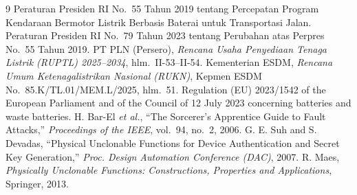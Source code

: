 \documentclass[11pt,a4paper]{article}
\begin{document}
\begin{thebibliography}{9}\small
{} Peraturan Presiden RI No.~55 Tahun 2019 tentang Percepatan Program Kendaraan Bermotor Listrik Berbasis Baterai untuk Transportasi Jalan.
 Peraturan Presiden RI No.~79 Tahun 2023 tentang Perubahan atas Perpres No.~55 Tahun 2019.
 PT PLN (Persero), \emph{Rencana Usaha Penyediaan Tenaga Listrik (RUPTL) 2025--2034}, hlm.~II-53--II-54.
 Kementerian ESDM, \emph{Rencana Umum Ketenagalistrikan Nasional (RUKN)}, Kepmen ESDM No.~85.K/TL.01/MEM.L/2025, hlm.~51.
 Regulation (EU) 2023/1542 of the European Parliament and of the Council of 12 July 2023 concerning batteries and waste batteries.
 H. Bar-El \emph{et al.}, ``The Sorcerer's Apprentice Guide to Fault Attacks,'' \emph{Proceedings of the IEEE}, vol.~94, no.~2, 2006.
 G. E. Suh and S. Devadas, ``Physical Unclonable Functions for Device Authentication and Secret Key Generation,'' \emph{Proc. Design Automation Conference (DAC)}, 2007.
 R. Maes, \emph{Physically Unclonable Functions: Constructions, Properties and Applications}, Springer, 2013.
\end{thebibliography}
\end{document}
